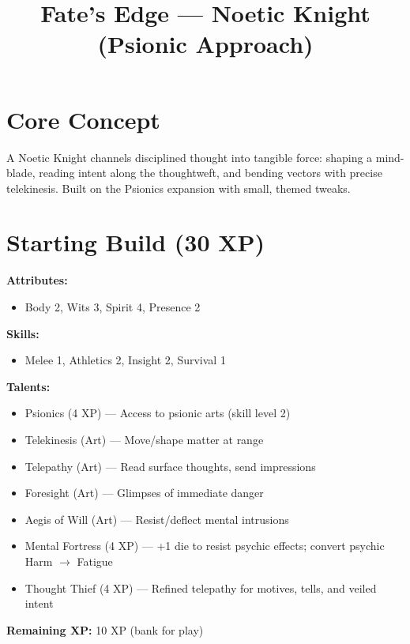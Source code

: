 \documentclass[11pt]{article}
\begin{document}
\title{Fate's Edge --- Noetic Knight (Psionic Approach)}
\author{}
\date{}
\maketitle

\section*{Core Concept}

A Noetic Knight channels disciplined thought into tangible force: shaping a mind-blade, reading intent along the thoughtweft, and bending vectors with precise telekinesis. Built on the Psionics expansion with small, themed tweaks.

\section*{Starting Build (30 XP)}

\textbf{Attributes:}
\begin{itemize}[leftmargin=*]
    \item Body 2, Wits 3, Spirit 4, Presence 2
\end{itemize}

\textbf{Skills:}
\begin{itemize}[leftmargin=*]
    \item Melee 1, Athletics 2, Insight 2, Survival 1
\end{itemize}

\textbf{Talents:}
\begin{itemize}[leftmargin=*]
    \item Psionics (4 XP) --- Access to psionic arts (skill level 2)
    \item Telekinesis (Art) --- Move/shape matter at range
    \item Telepathy (Art) --- Read surface thoughts, send impressions
    \item Foresight (Art) --- Glimpses of immediate danger
    \item Aegis of Will (Art) --- Resist/deflect mental intrusions
    \item Mental Fortress (4 XP) --- +1 die to resist psychic effects; convert psychic Harm $\rightarrow$ Fatigue
    \item Thought Thief (4 XP) --- Refined telepathy for motives, tells, and veiled intent
\end{itemize}

\textbf{Remaining XP:} 10 XP (bank for play)
\end{document}
